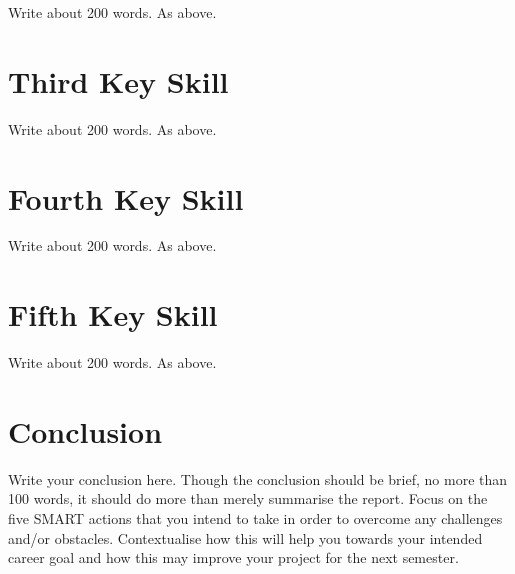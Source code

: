 \documentclass{scrartcl}
\begin{document}
Write about 200 words. As above.

\section{Third Key Skill}

Write about 200 words. As above.

\section{Fourth Key Skill}

Write about 200 words. As above.

\section{Fifth Key Skill}

Write about 200 words. As above.

\section{Conclusion}

Write your conclusion here. Though the conclusion should be brief, no more than 100 words, it should do more than merely summarise the report. Focus on the five SMART actions that you intend to take in order to overcome any challenges and/or obstacles. Contextualise how this will help you towards your intended career goal and how this may improve your project for the next semester.



\end{document}
